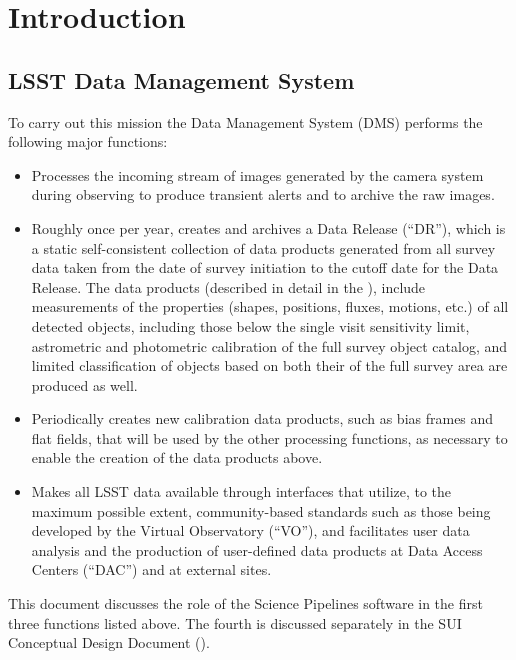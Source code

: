 \section{Introduction}

\subsection{LSST Data Management System}

To carry out this mission the Data Management System (DMS) performs the following major functions:

\begin{itemize}
\item Processes the incoming stream of images generated by the camera
  system during observing to produce transient alerts and to archive
  the raw images.

\item Roughly once per year, creates and archives a Data Release (``DR''),
  which is a static self-consistent collection of data products
  generated from all survey data taken from the date of survey
  initiation to the cutoff date for the Data Release. The data
  products (described in detail in the \DPDD), include measurements of
  the properties (shapes, positions, fluxes, motions, etc.) of all detected
  objects, including those below the single visit sensitivity limit,
  astrometric and photometric calibration of the full survey object
  catalog, and limited classification of objects based on both their
  of the full survey area are produced as well.

\item Periodically creates new calibration data products, such as bias
  frames and flat fields, that will be used by the other processing
  functions, as necessary to enable the creation of the data products above.

\item Makes all LSST data available through interfaces that utilize,
  to the maximum possible extent, community-based standards such as those
  being developed by the Virtual Observatory (``VO''), and facilitates user
  data analysis and the production of user-defined data products at Data
  Access Centers (``DAC'') and at external sites.
\end{itemize}

This document discusses the role of the Science Pipelines software in the first three functions listed above.  The fourth is discussed separately in the SUI Conceptual Design Document (\SUI).

